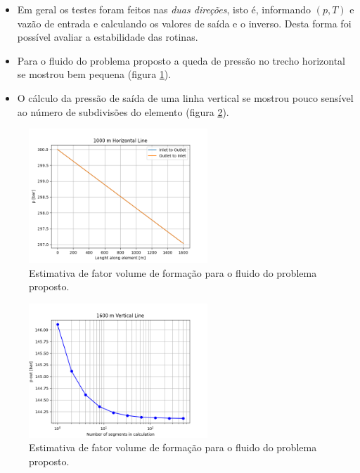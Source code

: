\documentclass[final,3p]{elsarticle}
\numberwithin{equation}{section}
\begin{document}
        \begin{itemize}
          \item Em geral os testes foram feitos nas \emph{duas direções}, isto é, informando $(p,T)$ e vazão de entrada e calculando os valores de saída e o inverso. Desta forma foi possível avaliar a estabilidade das rotinas.
          \item Para o fluido do problema proposto a queda de pressão no trecho horizontal se mostrou bem pequena (figura \ref{fig:linha_horizontal}).
          \item O cálculo da pressão de saída de uma linha vertical se mostrou pouco sensível ao número de subdivisões do elemento (figura \ref{fig:linha_vertical}).
        \end{itemize}

        \begin{figure}
          \centering
          \includegraphics[width=0.6\textwidth]{flow/horizontal.png}
          \caption{Estimativa de fator volume de formação para o fluido do problema proposto.}
          \label{fig:linha_horizontal}
        \end{figure}

        \begin{figure}
          \centering
          \includegraphics[width=0.6\textwidth]{flow/vertical_sensibility.png}
          \caption{Estimativa de fator volume de formação para o fluido do problema proposto.}
          \label{fig:linha_vertical}
        \end{figure}
\end{document}
